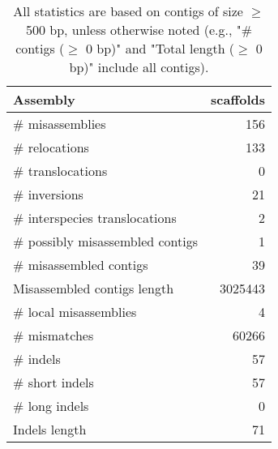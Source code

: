\documentclass[12pt,a4paper]{article}
\begin{document}
\begin{table}[ht]
\begin{center}
\caption{All statistics are based on contigs of size $\geq$ 500 bp, unless otherwise noted (e.g., "\# contigs ($\geq$ 0 bp)" and "Total length ($\geq$ 0 bp)" include all contigs).}
\begin{tabular}{|l*{1}{|r}|}
\hline
Assembly & scaffolds \\ \hline
\# misassemblies & 156 \\ \hline
\hspace{5mm}\# relocations & 133 \\ \hline
\hspace{5mm}\# translocations & 0 \\ \hline
\hspace{5mm}\# inversions & 21 \\ \hline
\hspace{5mm}\# interspecies translocations & 2 \\ \hline
\# possibly misassembled contigs & 1 \\ \hline
\# misassembled contigs & 39 \\ \hline
Misassembled contigs length & 3025443 \\ \hline
\# local misassemblies & 4 \\ \hline
\# mismatches & 60266 \\ \hline
\# indels & 57 \\ \hline
\hspace{5mm}\# short indels & 57 \\ \hline
\hspace{5mm}\# long indels & 0 \\ \hline
Indels length & 71 \\ \hline
\end{tabular}
\end{center}
\end{table}
\end{document}
